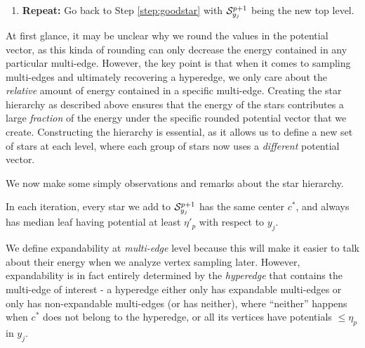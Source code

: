 \documentclass{article}
\begin{document}
{\begin{enumerate}
    Define $\eta'_p \defeq (1 - 1/\log^2 n) \eta_p$.
    Let us restrict our attention to the multi-edges $(c^*,u)\in G\setminus \Scal_{y_j}$
    satisfying $y_j[u] > \eta_p$,
    which
    contribute non-zero energy to the violation of (\ref{eq:check}).
    We say one such multi-edge $(c^*,u)$ is \textit{expandable} if, for
    the hyperedge $e$ that contains $(c^*,u)$, the majority of its vertices
    are assigned potentials $\geq \eta'_p$ by $y_j$, and \textit{non-expandable} otherwise
    (i.e. majority of $e$'s vertices have potentials $<\eta'_p$ in $y_j$).
    If a hyperedge $e$ contains one multi-edge $(c^*,u)\in G\setminus \Scal_{y_j}$
    that is expandable, then we add to the next level of collection $S^{p+1}_{y_j}$
    the star with $c^*$ being center and all of $e$'s other vertices as leaves.
    Otherwise, we ignore $e$ and the non-expandable multi-edges therein, if any. 

    \item \textbf{Repeat:} Go back to Step \ref{step:goodstar}
    with $\mathcal{S}_{y_j}^{p+1}$ being the new top level.
\end{enumerate}
}

At first glance, it may be unclear why we round the values in the potential vector, as this kinda of rounding can only decrease the energy contained in any particular multi-edge. However, the key point is that when it comes to sampling multi-edges and ultimately recovering a hyperedge, we only care about the \emph{relative} amount of energy contained in a specific multi-edge. Creating the star hierarchy as described above ensures that the energy of the stars contributes a large \emph{fraction} of the energy under the specific rounded potential vector that we create. Constructing the hierarchy is essential, as it allows us to define a new set of stars at each level, where each group of stars now uses a \emph{different} potential vector.

We now make some simply observations and remarks about the star hierarchy.

\begin{remark}\label{rmk:mlf}
    In each iteration,
    every star we add to $\mathcal{S}_{y_j}^{p+1}$
    has the same center $c^*$, and always has median leaf having
    potential at least $\eta'_p$ with respect to $y_j$.
\end{remark}

\begin{remark}
    We define expandability at \textit{multi-edge} level because this will make it easier
    to talk about their energy when we analyze vertex sampling later.
    However, expandability is in fact entirely determined by the \textit{hyperedge}
    that contains the multi-edge of interest - a hyperedge
    either only has expandable multi-edges or only has non-expandable multi-edges
    (or has neither),
    where ``neither'' happens when $c^*$ does not belong to the hyperedge,
    or all its vertices have potentials $\leq \eta_p$ in $y_j$.
\end{remark}
\end{document}
